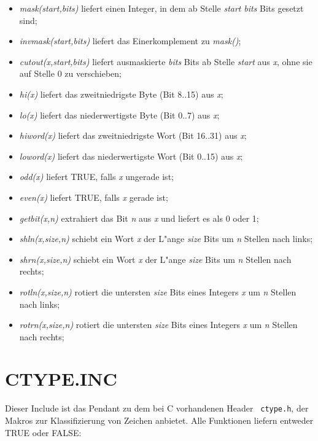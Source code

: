 \documentclass[12pt,a4paper,twoside]{report}
\begin{document}
{\begin{itemize}
\item{{\em mask(start,bits)} liefert einen Integer, in dem ab Stelle {\em
      start} {\em bits} Bits gesetzt sind;}
\item{{\em invmask(start,bits)} liefert das Einerkomplement zu {\em mask()};}
\item{{\em cutout(x,start,bits)} liefert ausmaskierte {\em bits} Bits ab
      Stelle {\em start} aus {\em x}, ohne sie auf Stelle 0 zu
      verschieben;}
\item{{\em hi(x)} liefert das zweitniedrigste Byte (Bit 8..15) aus {\em
      x};}
\item{{\em lo(x)} liefert das niederwertigste Byte (Bit 0..7) aus {\em
      x};}
\item{{\em hiword(x)} liefert das zweitniedrigste Wort (Bit 16..31) aus
      {\em x};}
\item{{\em loword(x)} liefert das niederwertigste Wort (Bit 0..15) aus
      {\em x};}
\item{{\em odd(x)} liefert TRUE, falls {\em x} ungerade ist;}
\item{{\em even(x)} liefert TRUE, falls {\em x} gerade ist;}
\item{{\em getbit(x,n)} extrahiert das Bit {\em n} aus {\em x} und liefert
      es als 0 oder 1;}
\item{{\em shln(x,size,n)} schiebt ein Wort {\em x} der L"ange {\em size}
      Bits um {\em n} Stellen nach links;}
\item{{\em shrn(x,size,n)} schiebt ein Wort {\em x} der L"ange {\em size}
      Bits um {\em n} Stellen nach rechts;}
\item{{\em rotln(x,size,n)} rotiert die untersten {\em size} Bits eines
      Integers {\em x} um {\em n} Stellen nach links;}
\item{{\em rotrn(x,size,n)} rotiert die untersten {\em size} Bits eines
      Integers {\em x} um {\em n} Stellen nach rechts;}
\end{itemize}

\section{CTYPE.INC}

Dieser Include ist das Pendant zu dem bei C vorhandenen Header {\tt
ctype.h}, der Makros zur Klassifizierung von Zeichen anbietet.  Alle
Funktionen liefern entweder TRUE oder FALSE:

}
\end{document}
